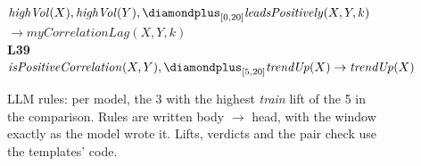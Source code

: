 \begin{figure}[t]
{\begin{minipage}{0.95\textwidth}
\hspace*{1.5em}\mbox{$\mathit{highVol}(X), \mathit{highVol}(Y), \diamondplus_{[0,20]} \mathit{leadsPositively}(X,Y,k)$}\\
\hspace*{1.5em}\hspace*{3em}\mbox{$\to \mathit{myCorrelationLag}(X,Y,k)$}\\[4pt]
\textbf{L39}\\
\hspace*{1.5em}\mbox{$\mathit{isPositiveCorrelation}(X,Y), \diamondplus_{[5,20]} \mathit{trendUp}(X) \to \mathit{trendUp}(X)$}
\end{minipage}}
\caption{\small{LLM rules: per model, the 3 with the highest \emph{train} lift of the 5 in the comparison. Rules are written body $\to$ head, with the window exactly as the model wrote it. Lifts, verdicts and the pair check use the templates' code.}}
\label{fig:llm-rules-pub}
\end{figure}
